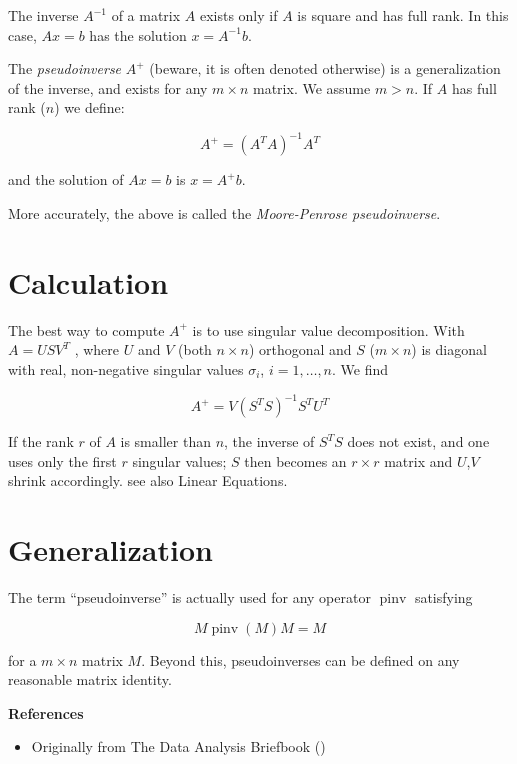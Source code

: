 \documentclass{article}
\begin{document}
The inverse $A^{-1}$ of a matrix $A$ exists only if $A$ is square and has full rank. In this case, $Ax = b$ has the solution $x = A^{-1}b$.

The \emph{pseudoinverse} $A^+$ (beware, it is often denoted otherwise) is a generalization of the inverse, and exists for any $m \times n$ matrix. We assume $m > n$. If $A$ has full rank ($n$) we define:

$$ A^+ = (A^T A)^{-1} A^T $$

and the solution of $Ax = b$ is $x = A^+b$.

More accurately, the above is called the \emph{Moore-Penrose pseudoinverse}.

\section{Calculation}

The best way to compute $A^+$ is to use singular value decomposition. With $A=USV^T$ , where $U$ and $V$ (both $n \times n$) orthogonal and $S$ ($m \times n$) is diagonal with real, non-negative singular values $\sigma_i$, $i=1,\ldots,n$.  We find 

$$ A^+ = V(S^TS)^{-1}S^TU^T $$

If the rank $r$ of $A$ is smaller than $n$, the inverse of $S^TS$ does not exist, and one uses only the first $r$ singular values; $S$ then becomes an $r \times r$ matrix and $U$,$V$ shrink accordingly. see also Linear Equations.

\section{Generalization}

The term ``pseudoinverse'' is actually used for any operator $\operatorname{pinv}$ satisfying

$$ M \operatorname{pinv}(M) M = M $$

for a $m \times n$ matrix $M$.  Beyond this, pseudoinverses can be 
defined on any reasonable matrix identity.

{\bf References}

\begin{itemize}
\item Originally from The Data Analysis Briefbook
()
\end{itemize}
\end{document}
